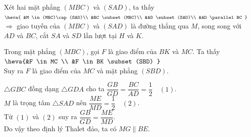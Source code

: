 \begin{bt}
{\begin{center}
\begin{tikzpicture}[
	>=stealth, line join=round, line cap=round, 
	scale=1,
	declare function={r=3; a=75;}]
\end{tikzpicture}
\end{center}
\begin{listEX}[1]
	\item Xét hai mặt phẳng $ (MBC) $ và $ (SAD) $, ta thấy
	$
		\heva{
			&M \in (MBC)\cap (SAD)\\
			&BC \subset (MBC)\\
			&AD \subset (SAD)\\
			&AD \parallel BC
		}
	$
	\\
	$ \Rightarrow $ giao tuyến của $ (MBC) $ và $ (SAD) $ là đường thẳng qua $ M $, song song với $ AD $ và $ BC $, cắt $ SA $ và $ SD $ lần lượt tại $ H $ và $ K $.
	\item Trong mặt phẳng $ (MBC) $, gọi $ F $ là giao điểm của $ BK $ và $ MC $.
	Ta thấy	$\heva{&F \in MC \\ &F \in BK \subset (SBD) }	$
	\\
	Suy ra $ F $ là giao điểm của $ MC $ và mặt phẳng $ (SBD) $.
	\item $ \triangle GBC $ đồng dạng $ \triangle GDA $ cho ta
	$\dfrac{GB}{GD} = \dfrac{BC}{AD} = \dfrac{1}{2} \quad (1)$.\\
	$ M $ là trọng tâm $ \triangle SAD $ nên $\dfrac{ME}{MD} = \dfrac{1}{2} \quad (2)$.\\
	Từ $ (1) $ và $ (2) $ suy ra $ \dfrac{GB}{GD} = \dfrac{ME}{MD} $. 
	\\
	Do vậy theo định lý Thalet đảo, ta có $ MG \parallel BE$.
\end{listEX}
}
\end{bt}

